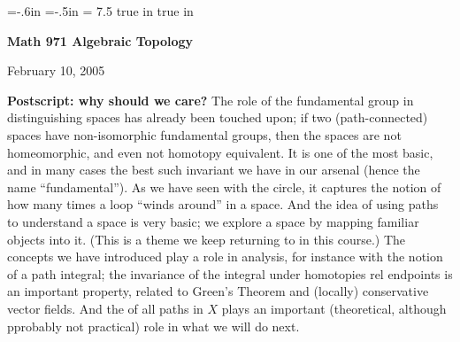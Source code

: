 
\overfullrule=0pt
\parindent=0pt

\nopagenumbers



\voffset=-.6in
\hoffset=-.5in
\hsize = 7.5 true in
 true in




\loadmsbm



\def\ctln{\centerline}
\def\u{\underbar}
\def\ssk{\smallskip}
\def\msk{\medskip}
\def\bsk{\bigskip}
\def\hsk{\hskip.1in}
\def\hhsk{\hskip.2in}
\def\dsl{\displaystyle}
\def\hskp{\hskip1.5in}

\def\lra{$\Leftrightarrow$ }
\def\ra{\rightarrow}
\def\mpto{\logmapsto}
\def\pu{\pi_1}
\def\mpu{$\pi_1$}
\def\sig{\Sigma}
\def\msig{$\Sigma$}
\def\ep{\epsilon}
\def\sset{\subseteq}
\def\del{\partial}
\def\inv{^{-1}}
\def\wtl{\widetilde}



\ctln{\bf Math 971 Algebraic Topology}

\ssk

\ctln{February 10, 2005}

\msk

\bsk

{\bf Postscript:  why should we care?} The role of the fundamental group
in distinguishing spaces has already been touched upon; if two 
(path-connected) spaces have non-isomorphic fundamental groups, then
the spaces are not homeomorphic, and even not homotopy equivalent.
It is one of the most basic, and in many cases the best such invariant
we have in our arsenal
(hence the name ``fundamental''). As we have seen with the circle, it
captures the notion of how many times a loop ``winds around'' in a space.
And the idea of using paths to understand a space is very basic; we 
explore a space by mapping familiar objects into it. (This is 
a theme we keep returning to in this course.) The concepts we 
have introduced play a role in analysis, for instance with the notion
of a path integral; the invariance of the integral under homotopies
rel endpoints is an important property, related to Green's Theorem
and (locally) conservative vector fields. And the 
of all paths in $X$ plays an important (theoretical, although
pprobably not practical) role in what we will do next.

\bsk

